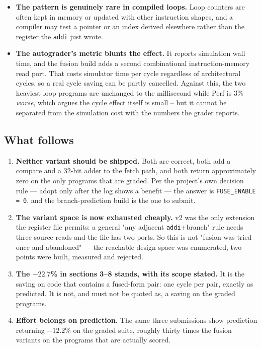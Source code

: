 \documentclass[11pt]{article}
\begin{document}
\begin{itemize}
\item \textbf{The pattern is genuinely rare in compiled loops.} Loop counters are often kept
in memory or updated with other instruction shapes, and a compiler may test a pointer or an
index derived elsewhere rather than the register the \texttt{addi} just wrote.
\item \textbf{The autograder's metric blunts the effect.} It reports simulation wall time, and
the fusion build adds a second combinational instruction-memory read port. That costs
simulator time per cycle regardless of architectural cycles, so a real cycle saving can be
partly cancelled. Against this, the two heaviest loop programs are unchanged to the
millisecond while Perf is 3\% \emph{worse}, which argues the cycle effect itself is small --
but it cannot be separated from the simulation cost with the numbers the grader reports.
\end{itemize}

\subsection{What follows}

\begin{enumerate}
\item \textbf{Neither variant should be shipped.} Both are correct, both add a compare and a
32-bit adder to the fetch path, and both return approximately zero on the only programs that
are graded. Per the project's own decision rule --- adopt only after the log shows a benefit
--- the answer is \texttt{FUSE\_ENABLE = 0}, and the branch-prediction build is the one to
submit.
\item \textbf{The variant space is now exhausted cheaply.} v2 was the only extension the
register file permits: a general "any adjacent \texttt{addi}+branch" rule needs three source
reads and the file has two ports. So this is not "fusion was tried once and abandoned" --- the
reachable design space was enumerated, two points were built, measured and rejected.
\item \textbf{The $-22.7$\% in sections 3--8 stands, with its scope stated.} It is the saving
on code that contains a fused-form pair: one cycle per pair, exactly as predicted. It is not,
and must not be quoted as, a saving on the graded programs.
\item \textbf{Effort belongs on prediction.} The same three submissions show prediction
returning $-12.2$\% on the graded suite, roughly thirty times the fusion variants on the
programs that are actually scored.
\end{enumerate}
\end{document}
